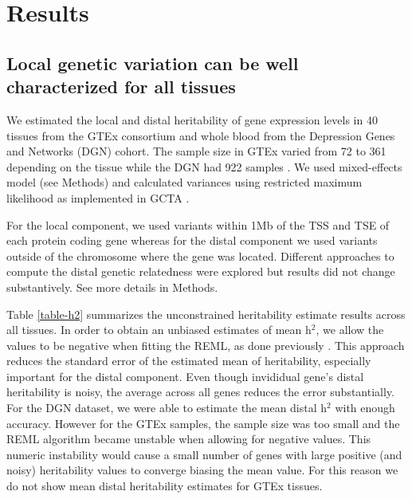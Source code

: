 \documentclass[10pt,letterpaper]{article}
\begin{document}
\section*{Results}
\subsection*{Local genetic variation can be well characterized for all
tissues}\label{local-genetic-variation-can-be-well-characterized-for-all-tissues}

We estimated the local and distal heritability of gene expression levels in 40 tissues from the GTEx consortium and whole blood from the Depression Genes and Networks (DGN) cohort. The sample size in GTEx varied from 72 to 361 depending on the tissue while the DGN had 922 samples \cite{Battle_2013}. We used mixed-effects model (see Methods) and calculated variances using restricted maximum likelihood as implemented in GCTA \cite{Yang_2011}.

For the local component, we used variants within 1Mb of the TSS and TSE of each protein coding gene whereas for the distal component we used variants outside of the chromosome where the gene was located. Different approaches to compute the distal genetic relatedness were explored but results did not change substantively. See more details in Methods.

Table \ref{table-h2} summarizes the unconstrained heritability estimate results across all tissues. In order to obtain an unbiased estimates of mean h$^2$, we allow the values to be negative when fitting the REML, as done previously \cite{Price_2011,Wright_2014}. This approach reduces the standard error of the estimated mean of heritability, especially important for the distal component. Even though invididual gene's distal heritability is noisy, the average across all genes reduces the error substantially. For the DGN dataset, we were able to estimate the mean distal h$^2$ with enough accuracy. However for the GTEx samples, the sample size was too small and the REML algorithm became unstable when allowing for negative values. This numeric instability would cause a small number of genes with large positive (and noisy) heritability values to converge biasing the mean value. For this reason we do not show mean distal heritability estimates for GTEx tissues. 
\end{document}
